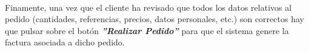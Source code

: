 \paragraph{}Finamente, una vez que el cliente ha revisado que todos los datos relativos al pedido (cantidades, referencias, precios, datos personales, etc.) son correctos hay que pulsar sobre el botón \textbf{\textit{''Realizar Pedido''}} para que el sistema genere la factura asociada a dicho pedido.